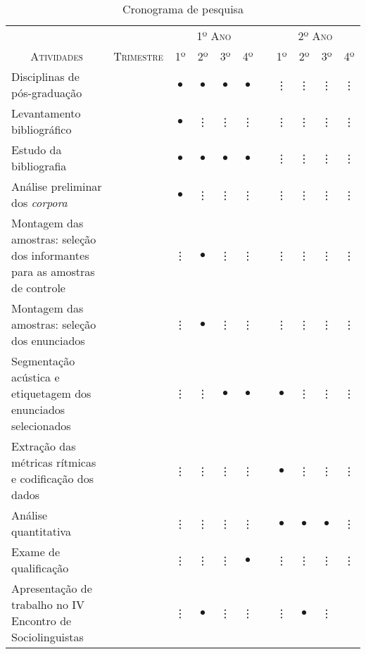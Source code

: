 \documentclass[
	a4paper,	%
	12pt,		%
	]{article}	%
\begin{document}
\begin{table}[h!]
	\vspace{1em}
	\caption{\rmfamily Cronograma de pesquisa}
	\vspace{.5em}
	\label{tab-crono}
	\begin{tabular}{m{.44\linewidth}cccccccccc}
		&& \multicolumn{4}{c}{\scshape\normalsize 1º Ano} &&
		\multicolumn{4}{c}{\scshape\normalsize 2º Ano} \\
		\cline{3-6}\cline{8-11}
		\multicolumn{1}{c}{\scshape\normalsize Atividades}&
		\scshape\normalsize Trimestre &\scshape\normalsize  1º
		&\scshape\normalsize  2º &\scshape\normalsize  3º
		&\scshape\normalsize  4º &\scshape\normalsize  &\scshape\normalsize
		1º &\scshape\normalsize  2º &\scshape\normalsize  3º &\scshape\normalsize  4º \\
		\hline
		\hline
		Disciplinas de pós-graduação
		&&$\bullet$&$\bullet$&$\bullet$&$\bullet$ &&\vdots&\vdots&\vdots &\vdots \\  
		\rowcolor{cinza1}
		Levantamento bibliográfico
		&&$\bullet$&\vdots&\vdots&\vdots&&\vdots&\vdots&\vdots&\vdots \\  
		Estudo da bibliografia &&$\bullet$&$\bullet$&$\bullet$&$\bullet$&&\vdots&\vdots&\vdots &\vdots \\  
		\rowcolor{cinza1}
		Análise preliminar dos \emph{corpora}
		&&$\bullet$&\vdots&\vdots&\vdots&&\vdots&\vdots&\vdots &\vdots \\  
		Montagem das amostras: seleção dos informantes para as amostras de
		controle &&\vdots&$\bullet$&\vdots&\vdots&&\vdots&\vdots&\vdots &\vdots \\  
		\rowcolor{cinza1}
		Montagem das amostras: seleção dos enunciados &&\vdots&$\bullet$&\vdots&\vdots&&\vdots&\vdots&\vdots &\vdots \\  
		Segmentação acústica e etiquetagem dos enunciados selecionados
		&&\vdots&\vdots&$\bullet$&$\bullet$&&$\bullet$&\vdots&\vdots &\vdots \\  	
		\rowcolor{cinza1}
		Extração das métricas rítmicas e codificação dos dados &&\vdots&\vdots&\vdots&\vdots&&$\bullet$&\vdots&\vdots &\vdots \\  
		Análise quantitativa &&\vdots&\vdots&\vdots&\vdots&&$\bullet$&$\bullet$&$\bullet$ &\vdots \\  
		\rowcolor{cinza1}
		Exame de qualificação &&\vdots&\vdots&\vdots&$\bullet$&&\vdots&\vdots&\vdots &\vdots \\  
		Apresentação de trabalho no IV Encontro de Sociolinguistas &&\vdots&$\bullet$&\vdots&\vdots&&\vdots&$\bullet$&\vdots

\end{tabular}
\end{table}
\end{document}
